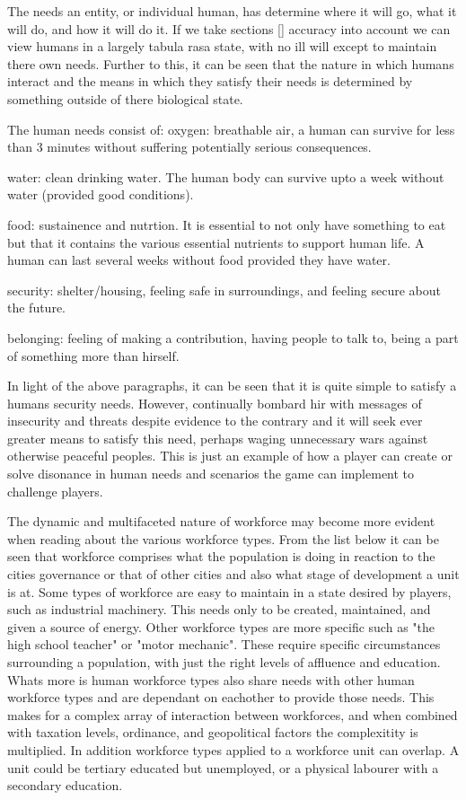 The needs an entity, or individual human, has determine where it will go, what it will do, and how it will do it. If we take sections [] accuracy into account we can view humans in a largely tabula rasa state, with no ill will except to maintain there own needs. Further to this, it can be seen that the nature in which humans interact and the means in which they satisfy their needs is determined by something outside of there biological state. 

The human needs consist of:
oxygen: breathable air, a human can survive for less than 3 minutes without suffering potentially serious consequences. 

water: clean drinking water. The human body can survive upto a week without water (provided good conditions). 

food: sustainence and nutrtion. It is essential to not only have something to eat but that it contains the various essential nutrients to support human life. A human can last several weeks without food provided they have water.

security: shelter/housing, feeling safe in surroundings, and feeling secure about the future.

belonging: feeling of making a contribution, having people to talk to, being a part of something more than hirself.

In light of the above paragraphs, it can be seen that it is quite simple to satisfy a humans security needs. However, continually bombard hir with messages of insecurity and threats despite evidence to the contrary and it will seek ever greater means to satisfy this need, perhaps waging unnecessary wars against otherwise peaceful peoples. This is just an example of how a player can create or solve disonance in human needs and scenarios the game can implement to challenge players.



The dynamic and multifaceted nature of workforce may become more evident when reading about the various workforce types. From the list below it can be seen that workforce comprises what the population is doing in reaction to the cities governance or that of other cities and also what stage of development a unit is at. Some types of workforce are easy to maintain in a state desired by players, such as industrial machinery. This needs only to be created, maintained, and given a source of energy. Other workforce types are more specific such as "the high school teacher" or "motor mechanic". These require specific circumstances surrounding a population, with just the right levels of affluence and education. Whats more is human workforce types also share needs with other human workforce types and are dependant on eachother to provide those needs. This makes for a complex array of interaction between workforces, and when combined with taxation levels, ordinance, and geopolitical factors the complexitity is multiplied. In addition workforce types applied to a workforce unit can overlap. A unit could be tertiary educated but unemployed, or a physical labourer with a secondary education. 

